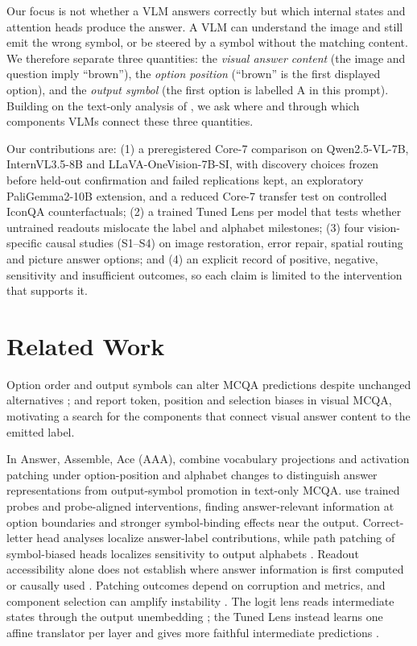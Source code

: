 \documentclass[11pt]{article}
\begin{document}
Our focus is not whether a VLM answers correctly but which internal states and attention heads produce the answer. A VLM can understand the image and still emit the wrong symbol, or be steered by a symbol without the matching content. We therefore separate three quantities: the \emph{visual answer content} (the image and question imply ``brown''), the \emph{option position} (``brown'' is the first displayed option), and the \emph{output symbol} (the first option is labelled A in this prompt). Building on the text-only analysis of \citet{wiegreffe2025answerassembleaceunderstanding}, we ask where and through which components VLMs connect these three quantities.

Our contributions are: (1) a preregistered Core-7 comparison on Qwen2.5-VL-7B, InternVL3.5-8B and LLaVA-OneVision-7B-SI, with discovery choices frozen before held-out confirmation and failed replications kept, an exploratory PaliGemma2-10B extension, and a reduced Core-7 transfer test on controlled IconQA counterfactuals; (2) a trained Tuned Lens per model that tests whether untrained readouts mislocate the label and alphabet milestones; (3) four vision-specific causal studies (S1--S4) on image restoration, error repair, spatial routing and picture answer options; and (4) an explicit record of positive, negative, sensitivity and insufficient outcomes, so each claim is limited to the intervention that supports it.

\section{Related Work}
\label{sec:related-work}

Option order and output symbols can alter MCQA predictions despite unchanged alternatives \citep{zheng2024large}; \citet{atabuzzaman2025benchmarking} and \citet{zeno2025choosing} report token, position and selection biases in visual MCQA, motivating a search for the components that connect visual answer content to the emitted label.

In Answer, Assemble, Ace (AAA), \citet{wiegreffe2025answerassembleaceunderstanding} combine vocabulary projections and activation patching under option-position and alphabet changes to distinguish answer representations from output-symbol promotion in text-only MCQA. \citet{wong2026decidebind} use trained probes and probe-aligned interventions, finding answer-relevant information at option boundaries and stronger symbol-binding effects near the output. Correct-letter head analyses localize answer-label contributions, while path patching of symbol-biased heads localizes sensitivity to output alphabets \citep{lieberum2023doescircuit,yang2025option}. Readout accessibility alone does not establish where answer information is first computed or causally used \citep{wiegreffe2025answerassembleaceunderstanding,wong2026decidebind}. Patching outcomes depend on corruption and metrics, and component selection can amplify instability \citep{zhang2024patching,heimersheim2024patching,meloux2026statistical}. The logit lens reads intermediate states through the output unembedding \citep{nostalgebraist2020logitlens}; the Tuned Lens instead learns one affine translator per layer and gives more faithful intermediate predictions \citep{belrose2023tunedlens}.
\end{document}
